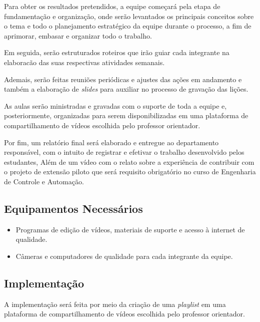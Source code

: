 \documentclass[a4paper,10pt]{article} %
\begin{document}
Para obter os resultados pretendidos, a equipe começará pela etapa de fundamentação e organização, onde serão levantados os principais conceitos sobre o tema e todo o planejamento estratégico da equipe durante o processo, a fim de aprimorar, embasar e organizar todo o trabalho.

Em seguida, serão estruturados roteiros que irão guiar cada integrante na elaboracão das suas respectivas atividades semanais.

Ademais, serão feitas reuniões periódicas e ajustes das ações em andamento e também a elaboração de \textit{slides} para auxiliar no processo de gravação das lições.

As aulas serão ministradas e gravadas com o suporte de toda a equipe e, posteriormente, organizadas para serem disponibilizadas em uma plataforma de compartilhamento de vídeos escolhida  pelo  professor orientador.

Por fim, um relatório final será elaborado e entregue ao departamento responsável, com o intuito de registrar e efetivar o trabalho desenvolvido pelos estudantes, Além de um vídeo com o relato sobre a experiência de contribuir com  o projeto de extensão piloto que será requisito obrigatório no curso de Engenharia de Controle e Automação.

\subsection{Equipamentos Necessários}

\begin{itemize}
 \item Programas de edição de vídeos, materiais de suporte e acesso à internet de qualidade.
 \item Câmeras e computadores de qualidade para cada integrante da equipe.
 \end{itemize}

\subsection{Implementação}
A implementação será feita por meio da criação de uma \textit{playlist} em uma plataforma de compartilhamento de vídeos escolhida pelo professor orientador.

\end{document}
